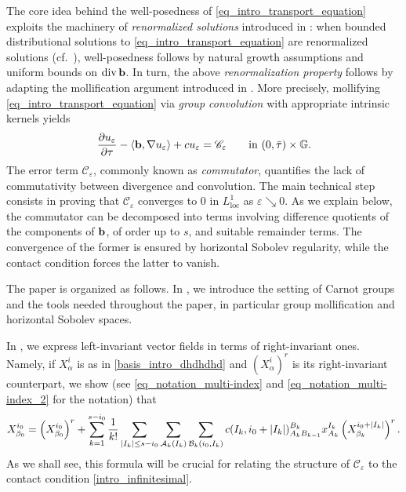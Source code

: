 \documentclass[11pt]{amsart}
\newcommand{\bb}{{\bf {b}}} %
\newcommand{\eps}{\varepsilon}
\DeclarePairedDelimiter{\abs}{\lvert}{\rvert}
\DeclareMathOperator{\divv}{div}
\theoremstyle{plain}
\theoremstyle{definition}
\theoremstyle{remark}
\numberwithin{equation}{section}
\begin{document}
\medskip
The core idea behind the well-posedness of \eqref{eq_intro_transport_equation} exploits the machinery of \emph{renormalized solutions} introduced in \cite{MR1022305}: when bounded distributional solutions to \eqref{eq_intro_transport_equation} are renormalized solutions (cf.~), well-posedness follows by natural growth assumptions and uniform bounds on $\divv \bb$. In turn, the above \emph{renormalization property} follows by adapting the mollification argument introduced in \cite{MR1022305}. More precisely, mollifying \eqref{eq_intro_transport_equation} via \emph{group convolution} with appropriate intrinsic kernels yields
\begin{equation}\label{commutators_intro}
\frac{\partial u_\eps}{\partial \tau}
-\left\langle \bb,\nabla u_\eps\right\rangle
+cu_\eps
=\mathscr C_\eps
\qquad \text{in $(0,\bar{\tau}) \times \mathbb{G}$.}
\end{equation}
The error term $\mathscr C_\eps$, commonly known as \emph{commutator}, quantifies the lack of commutativity between divergence and convolution. The main technical step consists in proving that $\mathscr C_\eps$ converges to $0$ in $L^1_{\mathrm{loc}}$ as $\eps\searrow 0$. As we explain below, the commutator can be decomposed into terms involving difference quotients of the components of $\bb$, of order up to $s$, and suitable remainder terms. The convergence of the former is ensured by horizontal Sobolev regularity, while the contact condition forces the latter to vanish.

\medskip
The paper is organized as follows. In , we introduce the setting of Carnot groups and the tools needed throughout the paper, in particular group mollification and horizontal Sobolev spaces.

\medskip
In , we express left-invariant vector fields in terms of right-invariant ones. Namely, if $X^i_\alpha$ is as in \eqref{basis_intro_dhdhdhd} and $\left(X^i_\alpha\right)^r$ is its right-invariant counterpart, we show (see \eqref{eq_notation_multi-index} and \eqref{eq_notation_multi-index_2} for the notation) that
\begin{equation} \label{eq_intro_left_right}
X^{i_0}_{\beta_0} = \left(X^{i_0}_{\beta_0}\right)^r + \sum_{k=1}^{s-i_0} \frac{1}{k!} \sum_{\abs*{I_k} \leq s-i_0} \sum_{\mathcal A_k(I_k)} \sum_{\mathcal B_k(i_0,I_k)} c(I_k,i_0+\abs*{I_k})^{B_k}_{A_k B_{k-1}} x^{I_k}_{A_k} \left(X^{i_0+\abs*{I_k}}_{\beta_k}\right)^r.
\end{equation}
As we shall see, this formula will be crucial for relating the structure of $\mathscr C_\eps$ to the contact condition \eqref{intro_infinitesimal}.
\end{document}
